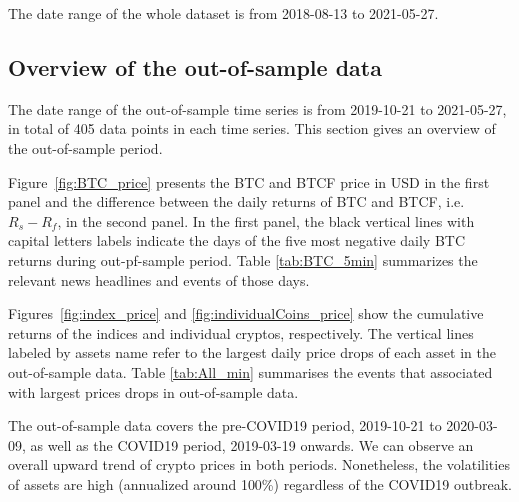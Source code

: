 The date range of the whole dataset is from 2018-08-13 to 2021-05-27. 


\subsection{Overview of the out-of-sample data}\label{subsec:oosdata}

The date range of the out-of-sample time series is from 2019-10-21 to
2021-05-27, in total of 405 data points in each time series. 
This section gives an overview of the out-of-sample period. 

Figure~\ref{fig:BTC_price} presents the BTC and BTCF price in USD in
the first panel and the difference between the daily returns of BTC and BTCF,
 i.e. $R_s - R_f$, in the second panel. 
In the first panel, the black vertical lines with capital letters
labels indicate the days of the five most negative daily BTC returns
during out-pf-sample period.
Table \ref{tab:BTC_5min} summarizes the relevant news headlines and
events of those days.  

Figures~\ref{fig:index_price} and \ref{fig:individualCoins_price} show
the cumulative returns of the indices and individual cryptos,
respectively.  The vertical lines labeled by assets name refer to the 
largest daily price drops of each asset in the out-of-sample data.  
Table \ref{tab:All_min} summarises the events that associated with largest prices drops in 
out-of-sample data. 

The out-of-sample data covers the pre-COVID19 period, 2019-10-21 to
2020-03-09, as well as the COVID19 period, 2019-03-19 onwards. 
We can observe an overall upward trend of crypto prices in both periods.
Nonetheless, the volatilities of assets are high (annualized around
100\%) regardless of the COVID19 outbreak. 

